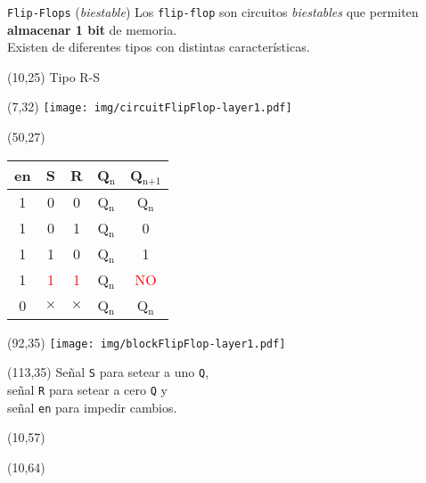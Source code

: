 \documentclass[aspectratio=169]{beamer}
\begin{document}
\begin{frame}[t]{\texttt{Flip-Flops} (\emph{biestable})}
    Los \texttt{flip-flop} son circuitos \emph{biestables} que permiten \textbf{almacenar 1 bit} de memoria.\\
    Existen de diferentes tipos con distintas características.\\
    \begin{textblock}{65}(10,25) \textcolor{naranjauca}{Tipo R-S} \end{textblock} %
    \begin{textblock}{65}(7,32) \texttt{[image: img/circuitFlipFlop-layer1.pdf]} \end{textblock} %
    \begin{textblock}{65}(50,27)
    \begin{tabular}{c|c|c|c||c}
    en & S & R & Q$_\text{n}$ & Q$_\text{n+1}$ \\ \hline
    1  & 0 & 0 & Q$_\text{n}$ & Q$_\text{n}$ \\
    1  & 0 & 1 & Q$_\text{n}$ & 0 \\
    1  & 1 & 0 & Q$_\text{n}$ & 1 \\
    1  & \textcolor{red}{1} & \textcolor{red}{1} & Q$_\text{n}$ & \textcolor{red}{\scriptsize{NO}} \\
    0  & $\times$ & $\times$ & Q$_\text{n}$ & Q$_\text{n}$ \\
    \end{tabular}
    \end{textblock}
    \begin{textblock}{65}(92,35) \texttt{[image: img/blockFlipFlop-layer1.pdf]} \end{textblock} %
    \begin{textblock}{38}(113,35) 
    \footnotesize Señal \textcolor{verdeuca}{\texttt{S}} para setear a uno \texttt{Q},\\
    señal \textcolor{verdeuca}{\texttt{R}} para setear a cero \texttt{Q} y\\
    señal \textcolor{verdeuca}{\texttt{en}} para impedir cambios.
    \end{textblock}
    \begin{textblock}{65}(10,57)  \end{textblock} %
    \begin{textblock}{65}(10,64)  \end{textblock} %

\end{frame}
\end{document}
